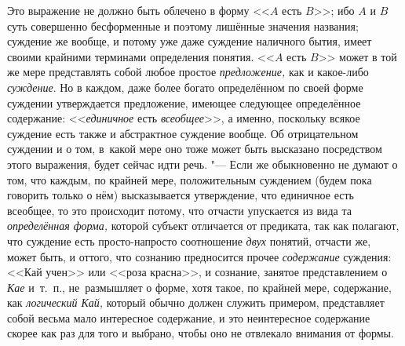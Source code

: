 Это выражение не должно быть облечено в форму <<$A$ есть $B$>>; ибо $A$ и $B$
суть совершенно бесформенные и поэтому лишённые значения названия; суждение же
вообще, и потому уже даже суждение наличного бытия, имеет своими крайними
терминами определения понятия. <<$A$ есть $B$>> может в той же мере
представлять собой любое простое {\em предложение,} как и какое-либо
{\em суждение}. Но в каждом, даже более богато определённом по своей форме
суждении утверждается предложение, имеющее следующее определённое содержание:
<<{\em единичное} есть {\em всеобщее}>>, а именно, поскольку всякое суждение
есть также и абстрактное суждение вообще. Об отрицательном суждении и о том,
в~какой мере оно тоже может быть высказано посредством этого выражения, будет
сейчас идти речь. "--- Если же обыкновенно не думают о том, что каждым, по
крайней мере, положительным суждением (будем пока говорить только о нём)
высказывается утверждение, что единичное есть всеобщее, то это происходит
потому, что отчасти упускается из вида та {\em определённая форма,} которой
субъект отличается от предиката, так как полагают, что суждение есть
просто-напросто соотношение {\em двух} понятий, отчасти же, может быть, и
оттого, что сознанию предносится прочее {\em содержание} суждения: <<Кай учен>>
или <<роза красна>>, и сознание, занятое представлением о {\em Кае} и~т.~п.,
не~размышляет о форме, хотя такое, по крайней мере, содержание, как {\em
логический Кай,} который обычно должен служить примером, представляет собой
весьма мало интересное содержание, и это неинтересное содержание скорее как раз
для того и выбрано, чтобы оно не отвлекало внимания от формы.

